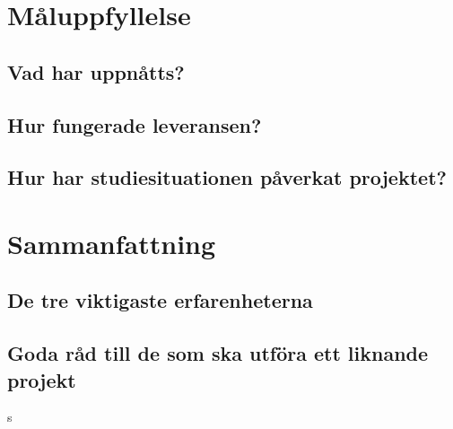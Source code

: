 \documentclass[a4paper,12pt,fleqn]{article}
\begin{document}
\section{Måluppfyllelse}
\subsection{Vad har uppnåtts?}
\subsection{Hur fungerade leveransen?}
\subsection{Hur har studiesituationen påverkat projektet?}
\section{Sammanfattning}
\subsection{De tre viktigaste erfarenheterna}
\subsection{Goda råd till de som ska utföra ett liknande projekt}s 
\end{document}
